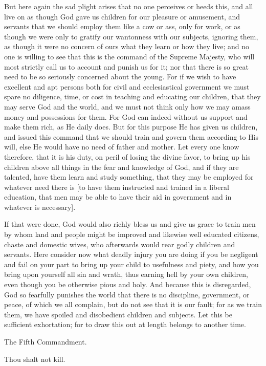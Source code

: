 But here again the sad plight arises that no one perceives or heeds
this, and all live on as though God gave us children for our pleasure
or amusement, and servants that we should employ them like a cow or
ass, only for work, or as though we were only to gratify our wantonness
with our subjects, ignoring them, as though it were no concern of ours
what they learn or how they live; and no one is willing to see that
this is the command of the Supreme Majesty, who will most strictly call
us to account and punish us for it; nor that there is so great need to
be so seriously concerned about the young. For if we wish to have
excellent and apt persons both for civil and ecclesiastical government
we must spare no diligence, time, or cost in teaching and educating our
children, that they may serve God and the world, and we must not think
only how we may amass money and possessions for them. For God can
indeed without us support and make them rich, as He daily does. But for
this purpose He has given us children, and issued this command that we
should train and govern them according to His will, else He would have
no need of father and mother. Let every one know therefore, that it is
his duty, on peril of losing the divine favor, to bring up his
children above all things in the fear and knowledge of God, and if they
are talented, have them learn and study something, that they may be
employed for whatever need there is [to have them instructed and
trained in a liberal education, that men may be able to have their aid
in government and in whatever is necessary].

If that were done, God would also richly bless us and give us grace to
train men by whom land and people might be improved and likewise well
educated citizens, chaste and domestic wives, who afterwards would rear
godly children and servants. Here consider now what deadly injury you
are doing if you be negligent and fail on your part to bring up your
child to usefulness and piety, and how you bring upon yourself all sin
and wrath, thus earning hell by your own children, even though you be
otherwise pious and holy. And because this is disregarded, God so
fearfully punishes the world that there is no discipline, government,
or peace, of which we all complain, but do not see that it is our
fault; for as we train them, we have spoiled and disobedient children
and subjects. Let this be sufficient exhortation; for to draw this out
at length belongs to another time.

The Fifth Commandment.

Thou shalt not kill.

